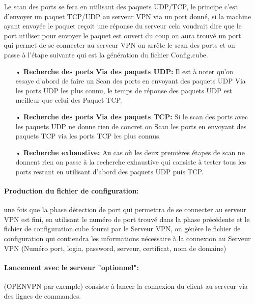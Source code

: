 \documentclass[12pt,a4paper]{article}
\begin{document}
Le scan des ports se fera en utilisant des paquets UDP/TCP, le principe c'est d'envoyer un paquet TCP/UDP au serveur VPN via un port donné, si la machine ayant envoyée le paquet reçoit une réponse du serveur cela voudrait dire que le port utiliser pour envoyer le paquet est ouvert du coup on aura trouvé un port qui permet de se connecter au serveur VPN on arrête le scan des ports et on passe à l'étape suivante qui est la génération du fichier Config.cube.\\
\begin{itemize}
\item[•]\textbf{Recherche des ports Via des paquets UDP: }
Il est à noter qu’on essaye d’abord de faire un Scan des ports en envoyant des paquets UDP Via les ports UDP les plus connu, le temps de réponse des paquets UDP est meilleur que celui des Paquet TCP.\\

\item[•]\textbf{Recherche des ports Via des paquets TCP: }
Si le scan des ports avec les paquets UDP ne donne rien de concret on Scan les ports en envoyant des paquets TCP via les ports TCP les plus connus.\\

\item[•]\textbf{Recherche exhaustive: }
Au cas où les deux premières étapes de scan ne donnent rien  on passe à la recherche exhaustive qui consiste à tester tous les ports restant en utilisant d’abord des paquets UDP puis TCP.\\
\end{itemize}
\paragraph{Production du fichier de configuration: }une fois que la phase détection de port qui permettra de se connecter au serveur VPN est fini, en utilisant le  numéro de port trouvé dans la phase précédente et le fichier de configuration.cube fourni par le Serveur VPN,  on génère le fichier de configuration qui contiendra les informations nécessaire à la connexion au Serveur VPN (Numéro port, login, password, serveur, certificat, nom de domaine)

\paragraph{Lancement avec le serveur "optionnel": }(OPENVPN par exemple) consiste à lancer la connexion du client au serveur via des lignes de commandes.
\end{document}
